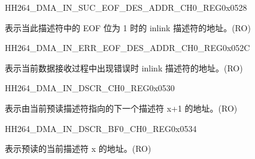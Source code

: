     
    \begin{register}{H}{H264\_DMA\_IN\_SUC\_EOF\_DES\_ADDR\_CH0\_REG}{0x0528}\label{regdesc:H264DMAINSUCEOFDESADDRCH0REG}
    \regnewline%
    \begin{regdesc}\begin{reglist}
    \label{fielddesc:H264DMAINSUCEOFDESADDRCH0}\item [H264\_DMA\_IN\_SUC\_EOF\_DES\_ADDR\_CH0] 表示当此描述符中的 EOF 位为 1 时的 inlink 描述符的地址。(RO)
    \end{reglist}\end{regdesc}
    \end{register}
    
    
    \begin{register}{H}{H264\_DMA\_IN\_ERR\_EOF\_DES\_ADDR\_CH0\_REG}{0x052C}\label{regdesc:H264DMAINERREOFDESADDRCH0REG}
    \regnewline%
    \begin{regdesc}\begin{reglist}
    \label{fielddesc:H264DMAINERREOFDESADDRCH0}\item [H264\_DMA\_IN\_ERR\_EOF\_DES\_ADDR\_CH0] 表示当前数据接收过程中出现错误时 inlink 描述符的地址。(RO)
    \end{reglist}\end{regdesc}
    \end{register}
    
    
    \begin{register}{H}{H264\_DMA\_IN\_DSCR\_CH0\_REG}{0x0530}\label{regdesc:H264DMAINDSCRCH0REG}
    \regnewline%
    \begin{regdesc}\begin{reglist}
    \label{fielddesc:H264DMAINLINKDSCRCH0}\item [H264\_DMA\_INLINK\_DSCR\_CH0] 表示由当前预读描述符指向的下一个描述符 x+1 的地址。(RO)
    \end{reglist}\end{regdesc}
    \end{register}
    
    
    \begin{register}{H}{H264\_DMA\_IN\_DSCR\_BF0\_CH0\_REG}{0x0534}\label{regdesc:H264DMAINDSCRBF0CH0REG}
    \regnewline%
    \begin{regdesc}\begin{reglist}
    \label{fielddesc:H264DMAINLINKDSCRBF0CH0}\item [H264\_DMA\_INLINK\_DSCR\_BF0\_CH0] 表示预读的当前描述符 x 的地址。(RO)
    \end{reglist}\end{regdesc}
    \end{register}
    
